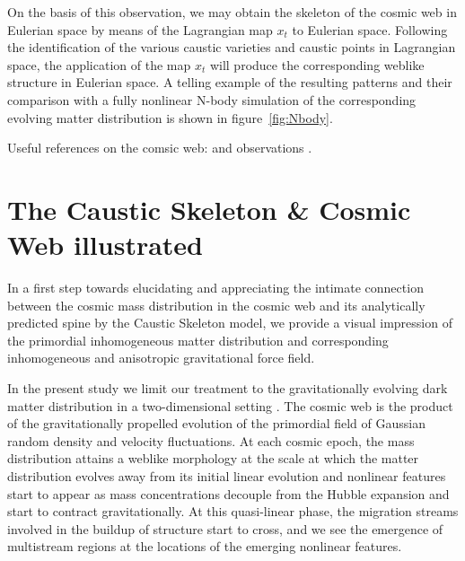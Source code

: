 \documentclass[a4paper, 11pt]{article}
\begin{document}
On the basis of this observation, we may obtain the skeleton of the
cosmic web in Eulerian space by
means of the Lagrangian map $x_t$ to Eulerian space. Following the
identification of the various
caustic varieties and caustic points in Lagrangian space, the
application of the map $x_t$ will
produce the corresponding weblike structure in Eulerian space. A telling
example of the resulting
patterns and their comparison with a fully nonlinear N-body simulation
of the corresponding
evolving matter distribution is shown in figure~\ref{fig:Nbody}.




\begin{framed}
Useful references on the comsic web:
\cite{Peebles:1980, Bond:1996, Weygaert:2008, Aragon:2010a,
Aragon:2010b, Jasche:2010, Kitaura:2013, Cautun:2014, Leclercq:2015,
Leclercq:2017, Libeskind:2017} and observations
\cite{Colless:2003, Tegmark:2004, Huchra:2012, Guzzo:2014}.
\end{framed}





\section{The Caustic Skeleton \& Cosmic Web
illustrated}\label{sec:Eulerian_space}
In a first step towards elucidating and appreciating the intimate
connection between the cosmic mass distribution in the cosmic web
and its analytically predicted spine by the Caustic Skeleton model, we
provide a visual impression of the primordial
inhomogeneous matter distribution and corresponding inhomogeneous and
anisotropic gravitational force field.

In the present study we limit our treatment to the gravitationally
evolving dark matter distribution in a two-dimensional setting .
The cosmic web is the product of the gravitationally propelled evolution
of the primordial field of Gaussian random density and
velocity fluctuations. At each cosmic epoch, the mass distribution
attains a weblike morphology at the scale at which the
matter distribution evolves away from its initial linear evolution and
nonlinear features start to appear as mass concentrations
decouple from the Hubble expansion and start to contract
gravitationally. At this quasi-linear phase, the migration streams involved
in the buildup of structure start to cross, and we see the emergence of
multistream regions at the locations of the emerging
nonlinear features.
\end{document}
